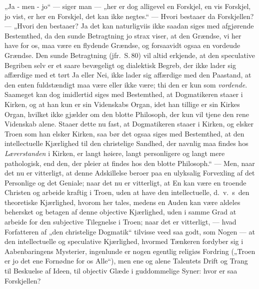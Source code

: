 „Ja - men - jo“ --- siger man --- „her er dog alligevel en
Forskjel, en vis Forskjel, jo vist, er her en Forskjel, det kan
ikke negtes.“ --- Hvori bestaaer da Forskjellen? --- „Hvori den
bestaaer? Ja det kan naturligviis ikke saadan siges med
afgjørende Bestemthed, da den sunde Betragtning jo strax viser, at
den Grændse, vi her have for os, maa være en flydende Grændse, og
forsaavidt ogsaa en vordeude Grændse. Den sunde Betragtning
(jfr.\ S.\,80) vil altid erkjende, at den speculative Begriben
selv er et saare bevægeligt og dialektisk Begreb, der ikke lader
sig affærdige med et tørt Ja eller Nei, ikke lader sig affærdige
med den Paastand, at den enten fuldstændigt maa være eller ikke
være; thi den er kun som \emph{vordende}. Saameget kan dog
imidlertid siges med Bestemthed, at Dogmatikeren staaer i Kirken,
og at han
 kun er sin Videnskabs Organ, idet han tillige er sin Kirkes Organ,
hvilket ikke gjælder om den blotte Philosoph, der kun vil tjene
den rene Videnskab alene. Staaer dette nu fast, at Dogmatikeren
staaer i Kirken, og elsker Troen som han elsker Kirken, saa bør
det ogsaa siges med Bestemthed, at den intellectuelle Kjærlighed
til den christelige Sandhed, der navnlig maa findes hos
\emph{Lærerstanden} i Kirken, er langt høiere, langt personligere
og langt mere pathologisk, end den, der pleier at findes hos den
blotte Philosoph.“ --- Men, naar det nu er vitterligt, at denne
Adskillelse beroer paa en ulyksalig Forvexling
{} af det Personlige og det Geniale; naar det nu er vitterligt, at
En kan være en troende Christen og arbeide kraftig i Troen, uden
at have den intellectuelle, d.\ v.\ s\ den theoretiske
Kjærlighed, hvorom her tales, medens en Auden kan være aldeles
behersket og betagen af denne objective Kjærlighed, uden i samme
Grad at arbeide for den subjective Tilegnelse i Troen; naar det er
vitterligt, --- hvad Forfatteren af „den christelige Dogmatik“
tilvisse veed saa godt, som Nogen --- at den intellectuelle og
speculative Kjærlighed, hvormed Tænkeren fordyber sig i
Aabenbaringens Mysterier, ingenlunde er nogen egentlig religiøs
Fordring („Troen er jo det ene Fornødne for os Alle“), men ene og
alene Talentets Drift og Trang til Beskuelse af Ideen, til
objectiv Glæde i guddommelige Syner: hvor er saa Forskjellen?

